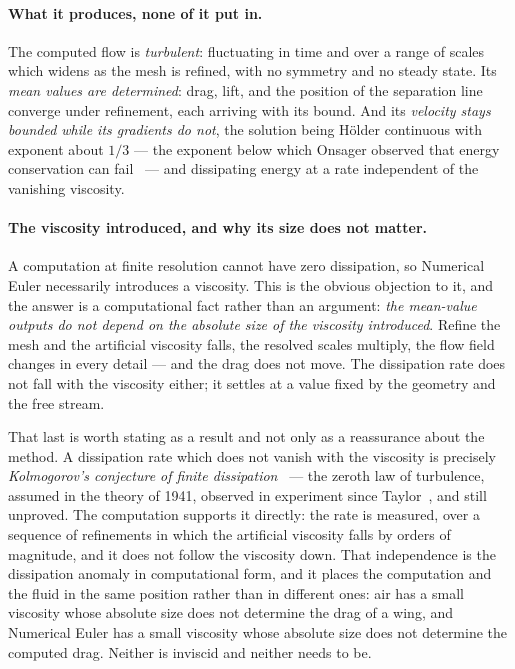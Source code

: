 \documentclass[11pt]{article}
\begin{document}
\paragraph{What it produces, none of it put in.} The computed flow is \emph{turbulent}: fluctuating
in time and over a range of scales which widens as the mesh is refined, with no symmetry and no
steady state. Its \emph{mean values are determined}: drag, lift, and the position of the separation
line converge under refinement, each arriving with its bound. And its \emph{velocity stays bounded
while its gradients do not}, the solution being H\"older continuous with exponent about $1/3$ --- the
exponent below which Onsager observed that energy conservation can fail~\cite{onsager} --- and
dissipating energy at a rate independent of the vanishing viscosity.

\paragraph{The viscosity introduced, and why its size does not matter.} A computation at finite
resolution cannot have zero dissipation, so Numerical Euler necessarily introduces a viscosity. This
is the obvious objection to it, and the answer is a computational fact rather than an argument:
\emph{the mean-value outputs do not depend on the absolute size of the viscosity introduced}. Refine
the mesh and the artificial viscosity falls, the resolved scales multiply, the flow field changes in
every detail --- and the drag does not move. The dissipation rate does not fall with the viscosity
either; it settles at a value fixed by the geometry and the free stream.

That last is worth stating as a result and not only as a reassurance about the method. A dissipation
rate which does not vanish with the viscosity is precisely \emph{Kolmogorov's conjecture of finite
dissipation}~\cite{kolmogorov41} --- the zeroth law of turbulence, assumed in the theory of 1941,
observed in experiment since Taylor~\cite{taylor}, and still unproved. The computation supports it
directly: the rate is measured, over a sequence of refinements in which the artificial viscosity
falls by orders of magnitude, and it does not follow the viscosity down. That independence is the
dissipation anomaly in computational form, and it places the computation and the fluid in the same
position rather than in different ones: air has a small viscosity whose absolute size does not
determine the drag of a wing, and Numerical Euler has a small viscosity whose absolute size does not
determine the computed drag. Neither is inviscid and neither needs to be.
\end{document}
